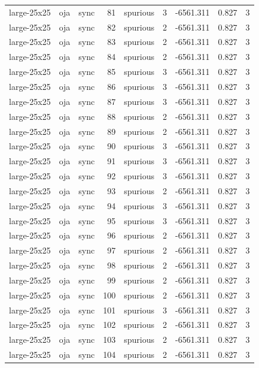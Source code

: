 \begin{tabular}{lllrlrrrr}
large-25x25 & oja & sync & 81 & spurious & 3 & -6561.311 & 0.827 & 3 \\
large-25x25 & oja & sync & 82 & spurious & 2 & -6561.311 & 0.827 & 3 \\
large-25x25 & oja & sync & 83 & spurious & 2 & -6561.311 & 0.827 & 3 \\
large-25x25 & oja & sync & 84 & spurious & 2 & -6561.311 & 0.827 & 3 \\
large-25x25 & oja & sync & 85 & spurious & 3 & -6561.311 & 0.827 & 3 \\
large-25x25 & oja & sync & 86 & spurious & 3 & -6561.311 & 0.827 & 3 \\
large-25x25 & oja & sync & 87 & spurious & 3 & -6561.311 & 0.827 & 3 \\
large-25x25 & oja & sync & 88 & spurious & 2 & -6561.311 & 0.827 & 3 \\
large-25x25 & oja & sync & 89 & spurious & 2 & -6561.311 & 0.827 & 3 \\
large-25x25 & oja & sync & 90 & spurious & 3 & -6561.311 & 0.827 & 3 \\
large-25x25 & oja & sync & 91 & spurious & 3 & -6561.311 & 0.827 & 3 \\
large-25x25 & oja & sync & 92 & spurious & 3 & -6561.311 & 0.827 & 3 \\
large-25x25 & oja & sync & 93 & spurious & 2 & -6561.311 & 0.827 & 3 \\
large-25x25 & oja & sync & 94 & spurious & 3 & -6561.311 & 0.827 & 3 \\
large-25x25 & oja & sync & 95 & spurious & 3 & -6561.311 & 0.827 & 3 \\
large-25x25 & oja & sync & 96 & spurious & 2 & -6561.311 & 0.827 & 3 \\
large-25x25 & oja & sync & 97 & spurious & 2 & -6561.311 & 0.827 & 3 \\
large-25x25 & oja & sync & 98 & spurious & 2 & -6561.311 & 0.827 & 3 \\
large-25x25 & oja & sync & 99 & spurious & 2 & -6561.311 & 0.827 & 3 \\
large-25x25 & oja & sync & 100 & spurious & 2 & -6561.311 & 0.827 & 3 \\
large-25x25 & oja & sync & 101 & spurious & 3 & -6561.311 & 0.827 & 3 \\
large-25x25 & oja & sync & 102 & spurious & 2 & -6561.311 & 0.827 & 3 \\
large-25x25 & oja & sync & 103 & spurious & 2 & -6561.311 & 0.827 & 3 \\
large-25x25 & oja & sync & 104 & spurious & 2 & -6561.311 & 0.827 & 3 \\

\end{tabular}
